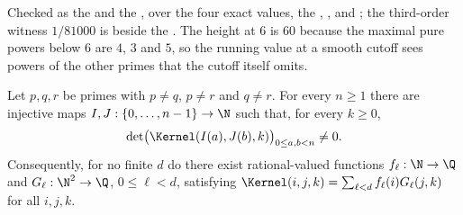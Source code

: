 \noindent Checked as the
 and the
, over the four exact values, the
,
,
 and
;
the third-order witness $1/81000$ is
beside the
.  The height at $6$ is $60$ because the maximal pure powers below $6$ are
$4$, $3$ and $5$, so the running value at a smooth cutoff sees powers of the
other primes that the cutoff itself omits.

\begin{theorem}\label{long269:res:infinite-rank}
\label{long269:res:lead-infinite-rank}
Let $p,q,r$ be primes with $p\ne q$, $p\ne r$ and $q\ne r$.  For every
$n\ge1$ there are injective maps $I,J:\{0,\ldots,n-1\}\to\N$ such that, for
every $k\ge0$,
\[
 \det\bigl(\Kernel(I(a),J(b),k)\bigr)_{0\le a,b<n}\ne0 .
\]
Consequently, for no finite $d$ do there exist rational-valued functions
$f_\ell:\N\to\Q$ and $G_\ell:\N^{2}\to\Q$, $0\le\ell<d$, satisfying
$\Kernel(i,j,k)=\sum_{\ell<d}f_\ell(i)G_\ell(j,k)$ for all $i,j,k$.
\end{theorem}

